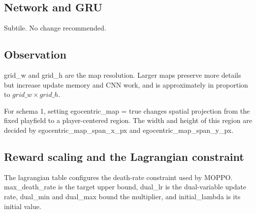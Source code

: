 \subsection{Network and GRU}

Subtile. No change recommended.

\subsection{Observation}

grid\_w and grid\_h are the map resolution. Larger maps preserve more 
details but increase update memory and CNN work, and is approximately 
in proportion to $grid\_w \times grid\_h$. 

For schema 1, setting egocentric\_map = true changes spatial
projection from the fixed playfield to a player-centered region.  The width
and height of this region are decided by
egocentric\_map\_span\_x\_px and
egocentric\_map\_span\_y\_px.

\subsection{Reward scaling and the Lagrangian constraint}

The lagrangian table configures the death-rate constraint used by
MOPPO.  max\_death\_rate is the target upper bound,
dual\_lr is the dual-variable update rate,
dual\_min and dual\_max bound the multiplier, and
initial\_lambda is its initial value.
